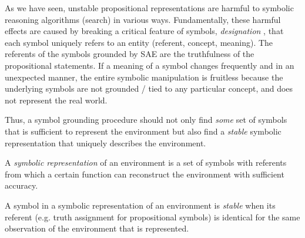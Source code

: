 
As we have seen, unstable propositional representations are harmful to symbolic reasoning algorithms (search)
in various ways.
Fundamentally,
these harmful effects are caused by breaking a critical feature of symbols, \emph{designation} \cite{newell1976computer,newell1980physical},
that each symbol uniquely refers to an entity (referent, concept, meaning).
The referents of the symbols grounded by SAE are the truthfulness of the propositional statements.
If a meaning of a symbol changes frequently and in an unexpected manner, the entire symbolic manipulation is fruitless
because the underlying symbols are not grounded / tied to any particular concept, and does not represent the real world.



Thus, a symbol grounding procedure should not only find \emph{some} set of symbols that is sufficient to represent the
environment but also find a \emph{stable} symbolic representation that uniquely describes the environment.

\begin{defi}
A \emph{symbolic representation} of an environment is a set of symbols with referents
from which a certain function can reconstruct the environment with sufficient accuracy.
\end{defi}

\begin{defi}
A symbol in a symbolic representation of an environment is \emph{stable}
when its referent (e.g. truth assignment for propositional symbols) is identical
for the same observation of the environment that is represented.
\end{defi}


